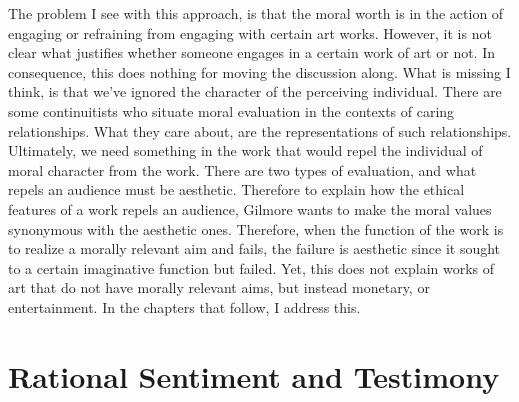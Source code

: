 \documentclass[phdthesis,12pt,final,a4paper]{wuthesis}
\theoremstyle{definition}
\theoremstyle{definition}
\theoremstyle{definition}
\theoremstyle{definition}
\theoremstyle{remark}
\begin{document}
The problem I see with this approach, is that the moral worth is in the action of engaging or refraining from engaging with certain art works. However, it is not clear what justifies whether someone engages in a certain work of art or not. In consequence, this does nothing for moving the discussion along. What is missing I think, is that we've ignored the character of the perceiving individual. There are some continuitists who situate moral evaluation in the contexts of caring relationships. What they care about, are the representations of such relationships. Ultimately, we need something in the work that would repel the individual of moral character from the work. There are two types of evaluation, and what repels an audience must be aesthetic. Therefore to explain how the ethical features of a work repels an audience, Gilmore wants to make the moral values synonymous with the aesthetic ones. Therefore, when the function of the work is to realize a morally relevant aim and fails, the failure is aesthetic since it sought to a certain imaginative function but failed. Yet, this does not explain works of art that do not have morally relevant aims, but instead monetary, or entertainment. In the chapters that follow, I address this.

\chapter{Rational Sentiment and Testimony}\label{rational-sentiment-and-testimony}
\end{document}
